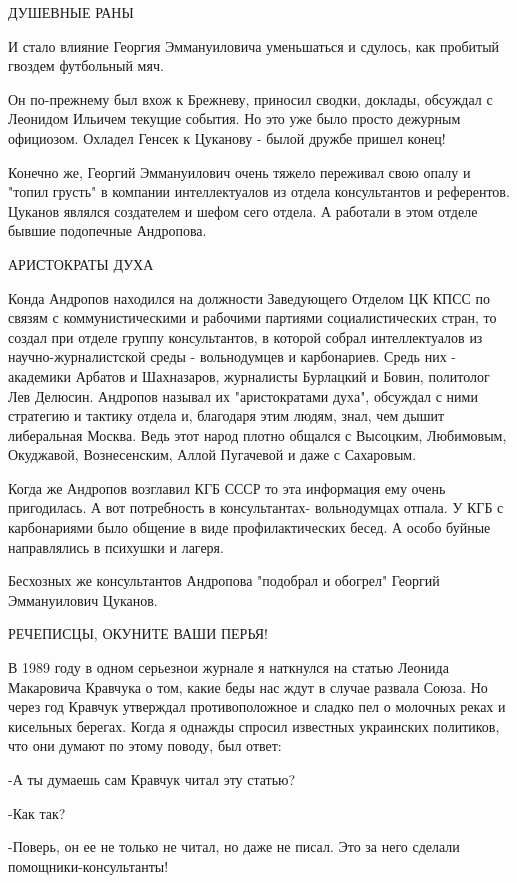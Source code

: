 ДУШЕВНЫЕ РАНЫ

И стало влияние Георгия Эммануиловича уменьшаться и сдулось, как пробитый
гвоздем футбольный мяч.

Он по-прежнему был вхож к Брежневу, приносил сводки, доклады, обсуждал с
Леонидом Ильичем текущие события. Но это уже было просто дежурным официозом.
Охладел Генсек к Цуканову - былой дружбе пришел конец!

Конечно же, Георгий Эммануилович очень тяжело переживал свою опалу и "топил
грусть" в компании интеллектуалов из отдела консультантов и референтов. Цуканов
являлся создателем и шефом сего отдела. А работали в этом отделе бывшие
подопечные Андропова.

АРИСТОКРАТЫ ДУХА

Конда Андропов находился на должности Заведующего Отделом ЦК КПСС по связям с
коммунистическими и рабочими партиями социалистических стран, то создал при
отделе группу консультантов, в которой собрал интеллектуалов из
научно-журналистской среды - вольнодумцев и карбонариев. Средь них - академики
Арбатов и Шахназаров, журналисты Бурлацкий и Бовин, политолог Лев Делюсин.
Андропов называл их "аристократами духа", обсуждал с ними стратегию и тактику
отдела и, благодаря этим людям, знал, чем дышит либеральная Москва. Ведь этот
народ плотно общался с Высоцким, Любимовым, Окуджавой, Вознесенским, Аллой
Пугачевой и даже с Сахаровым.

Когда же Андропов возглавил КГБ СССР то эта информация ему очень пригодилась. А
вот потребность в консультантах- вольнодумцах отпала. У КГБ с карбонариями было
общение в виде профилактических бесед. А особо буйные направлялись в психушки и
лагеря.

Бесхозных же консультантов Андропова "подобрал и обогрел" Георгий Эммануилович
Цуканов.

РЕЧЕПИСЦЫ, ОКУНИТЕ ВАШИ ПЕРЬЯ!

В 1989 году в одном серьезнои журнале я наткнулся на статью Леонида Макаровича
Кравчука о том, какие беды нас ждут в случае развала Союза. Но через год
Кравчук утверждал противоположное и сладко пел о молочных реках и кисельных
берегах. Когда я однажды спросил известных украинских политиков, что они думают
по этому поводу, был ответ:

-А ты думаешь сам Кравчук читал эту статью?

-Как так?

-Поверь, он ее не только не читал, но даже не писал. Это за него сделали
помощники-консультанты!

